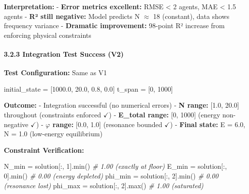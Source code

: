 \documentclass[
]{article}
\newenvironment{Shaded}{}{}
\newcommand{\BuiltInTok}[1]{\textcolor[rgb]{0.00,0.50,0.00}{#1}}
\newcommand{\CommentTok}[1]{\textcolor[rgb]{0.38,0.63,0.69}{\textit{#1}}}
\newcommand{\DecValTok}[1]{\textcolor[rgb]{0.25,0.63,0.44}{#1}}
\newcommand{\FloatTok}[1]{\textcolor[rgb]{0.25,0.63,0.44}{#1}}
\newcommand{\NormalTok}[1]{#1}
\newcommand{\OperatorTok}[1]{\textcolor[rgb]{0.40,0.40,0.40}{#1}}
\begin{document}
\textbf{Interpretation:} - \textbf{Error metrics excellent:} RMSE
\textless{} 2 agents, MAE \textless{} 1.5 agents - \textbf{R² still
negative:} Model predicts N $\approx$ 18 (constant), data shows frequency
variance - \textbf{Dramatic improvement:} 98-point R² increase from
enforcing physical constraints

\paragraph{3.2.3 Integration Test Success
(V2)}\label{integration-test-success-v2}

\textbf{Test Configuration:} Same as V1

\begin{Shaded}
\begin{Highlighting}[]
\NormalTok{initial\_state }\OperatorTok{=}\NormalTok{ [}\FloatTok{1000.0}\NormalTok{, }\FloatTok{20.0}\NormalTok{, }\FloatTok{0.8}\NormalTok{, }\FloatTok{0.0}\NormalTok{]}
\NormalTok{t\_span }\OperatorTok{=}\NormalTok{ [}\DecValTok{0}\NormalTok{, }\DecValTok{1000}\NormalTok{]}
\end{Highlighting}
\end{Shaded}

\textbf{Outcome:} - Integration successful (no numerical errors) -
\textbf{N range:} {[}1.0, 20.0{]} throughout (constraints enforced $\checkmark$) -
\textbf{E\_total range:} {[}0, 1000{]} (energy non-negative $\checkmark$) -
\textbf{$\varphi$ range:} {[}0.0, 1.0{]} (resonance bounded $\checkmark$) - \textbf{Final
state:} E = 6.0, N = 1.0 (low-energy equilibrium)

\textbf{Constraint Verification:}

\begin{Shaded}
\begin{Highlighting}[]
\NormalTok{N\_min }\OperatorTok{=}\NormalTok{ solution[:, }\DecValTok{1}\NormalTok{].}\BuiltInTok{min}\NormalTok{()  }\CommentTok{\# 1.00 (exactly at floor)}
\NormalTok{E\_min }\OperatorTok{=}\NormalTok{ solution[:, }\DecValTok{0}\NormalTok{].}\BuiltInTok{min}\NormalTok{()  }\CommentTok{\# 0.00 (energy depleted)}
\NormalTok{phi\_min }\OperatorTok{=}\NormalTok{ solution[:, }\DecValTok{2}\NormalTok{].}\BuiltInTok{min}\NormalTok{()  }\CommentTok{\# 0.00 (resonance lost)}
\NormalTok{phi\_max }\OperatorTok{=}\NormalTok{ solution[:, }\DecValTok{2}\NormalTok{].}\BuiltInTok{max}\NormalTok{()  }\CommentTok{\# 1.00 (saturated)}
\end{Highlighting}
\end{Shaded}
\end{document}

